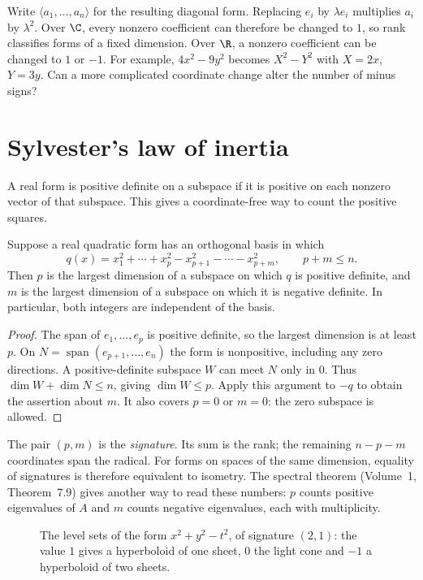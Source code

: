 Write $\langle a_1,\ldots,a_n\rangle$ for the resulting diagonal form.
Replacing $e_i$ by $\lambda e_i$ multiplies $a_i$ by $\lambda^2$.
Over $\C$, every nonzero coefficient can therefore be changed to $1$,
so rank classifies forms of a fixed dimension.
Over $\R$, a nonzero coefficient can be changed to $1$ or $-1$.
For example, $4x^2-9y^2$ becomes $X^2-Y^2$ with $X=2x$, $Y=3y$.
Can a more complicated coordinate change alter the number of minus signs?

\section{Sylvester's law of inertia}

A real form is positive definite on a subspace if it is positive on each
nonzero vector of that subspace. This gives a coordinate-free way to count
the positive squares.

\begin{theorem}\label{geometry:thm:sylvester}
Suppose a real quadratic form has an orthogonal basis in which
\[
 q(x)=x_1^2+\cdots+x_p^2-x_{p+1}^2-\cdots-x_{p+m}^2,
 \qquad p+m\le n.
\]
Then $p$ is the largest dimension of a subspace on which $q$ is positive
definite, and $m$ is the largest dimension of a subspace on which it is
negative definite. In particular, both integers are independent of the basis.
\end{theorem}
\begin{proof}
The span of $e_1,\ldots,e_p$ is positive definite, so the largest dimension
is at least $p$. On $N=\operatorname{span}(e_{p+1},\ldots,e_n)$ the
form is nonpositive, including any zero directions.
A positive-definite subspace $W$ can meet $N$ only in $0$.
Thus $\dim W+\dim N\le n$, giving $\dim W\le p$.
Apply this argument to $-q$ to obtain the assertion about $m$.
It also covers $p=0$ or $m=0$: the zero subspace is allowed.
\end{proof}

The pair $(p,m)$ is the \emph{signature}. Its sum is the rank; the remaining
$n-p-m$ coordinates span the radical. For forms on spaces of the same
dimension, equality of signatures is therefore equivalent to isometry.
The spectral theorem (Volume~1, Theorem~7.9) gives another way to read
these numbers: $p$ counts positive eigenvalues of $A$ and $m$ counts
negative eigenvalues, each with multiplicity.

\begin{figure}[ht]
\centering
{}
\caption{The level sets of the form $x^2+y^2-t^2$, of signature $(2,1)$: the value $1$ gives a hyperboloid of one sheet, $0$ the light cone and
$-1$ a hyperboloid of two sheets.}
\label{geometry:fig:lorentz}
\end{figure}


